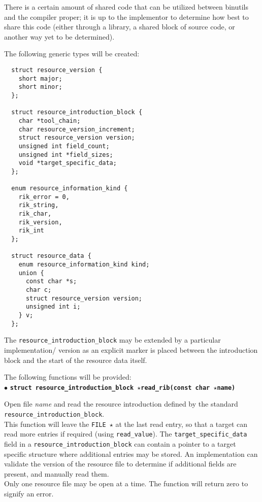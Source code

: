 \documentclass{article}
\begin{document}
  There is a certain amount of shared code that can be utilized between
binutils and the compiler proper; it is up to the implementor to determine
how best to share this code (either through a library, a shared block of
source code, or another way yet to be determined).

  The following generic types will be created:

\begin{verbatim}
  struct resource_version {
    short major;
    short minor;
  };

  struct resource_introduction_block {
    char *tool_chain;
    char resource_version_increment;
    struct resource_version version;
    unsigned int field_count;
    unsigned int *field_sizes;
    void *target_specific_data;
  };

  enum resource_information_kind {
    rik_error = 0,
    rik_string,
    rik_char,
    rik_version,
    rik_int
  };

  struct resource_data {
    enum resource_information_kind kind;
    union {
      const char *s;
      char c;
      struct resource_version version;
      unsigned int i;
    } v;
  };
\end{verbatim}

  The \texttt{resource\_introduction\_block} may be extended by a particular
  implementation/ version as an explicit marker is placed between the 
  introduction block and the start of the resource data itself.

  The following functions will be provided: \\

  $\bullet$ \textbf{\texttt{struct resource\_introduction\_block $\star$read\_rib(const char $\star$name)}} \newline

  \begin{minipage}[c]{10cm}
  Open file \textit{name} and read the resource introduction defined by the
  standard \texttt{resource\_introduction\_block}.  \\

  This function will leave the \texttt{FILE $\star$} at the last read entry, 
  so that a target can read more entries if required (using 
  \texttt{read\_value}).  The \texttt{target\_specific\_data} field in a 
  \texttt{resource\_introduction\_block} can contain a pointer to a target
  specific structure where additional entries may be stored.  An implementation
  can validate the version of the resource file to determine if additional
  fields are present, and manually read them. \\

  Only one resource file may be open at a time.  The function will return 
  zero to signify an error.  \\
  \end{minipage}
\end{document}
